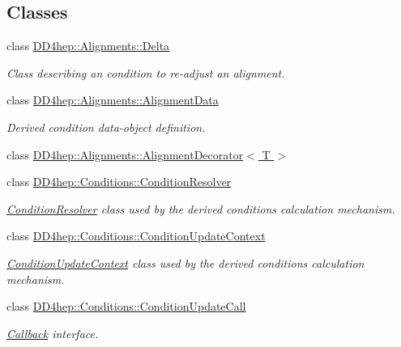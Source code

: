 \subsection*{Classes}
\begin{DoxyCompactItemize}
\item 
class \hyperlink{class_d_d4hep_1_1_alignments_1_1_delta}{D\+D4hep\+::\+Alignments\+::\+Delta}
\begin{DoxyCompactList}\small\item\em Class describing an condition to re-\/adjust an alignment. \end{DoxyCompactList}\item 
class \hyperlink{class_d_d4hep_1_1_alignments_1_1_alignment_data}{D\+D4hep\+::\+Alignments\+::\+Alignment\+Data}
\begin{DoxyCompactList}\small\item\em Derived condition data-\/object definition. \end{DoxyCompactList}\item 
class \hyperlink{class_d_d4hep_1_1_alignments_1_1_alignment_decorator}{D\+D4hep\+::\+Alignments\+::\+Alignment\+Decorator$<$ T $>$}
\item 
class \hyperlink{class_d_d4hep_1_1_conditions_1_1_condition_resolver}{D\+D4hep\+::\+Conditions\+::\+Condition\+Resolver}
\begin{DoxyCompactList}\small\item\em \hyperlink{class_d_d4hep_1_1_conditions_1_1_condition_resolver}{Condition\+Resolver} class used by the derived conditions calculation mechanism. \end{DoxyCompactList}\item 
class \hyperlink{class_d_d4hep_1_1_conditions_1_1_condition_update_context}{D\+D4hep\+::\+Conditions\+::\+Condition\+Update\+Context}
\begin{DoxyCompactList}\small\item\em \hyperlink{class_d_d4hep_1_1_conditions_1_1_condition_update_context}{Condition\+Update\+Context} class used by the derived conditions calculation mechanism. \end{DoxyCompactList}\item 
class \hyperlink{class_d_d4hep_1_1_conditions_1_1_condition_update_call}{D\+D4hep\+::\+Conditions\+::\+Condition\+Update\+Call}
\begin{DoxyCompactList}\small\item\em \hyperlink{class_d_d4hep_1_1_callback}{Callback} interface. \end{DoxyCompactList}\item 

\end{DoxyCompactItemize}
